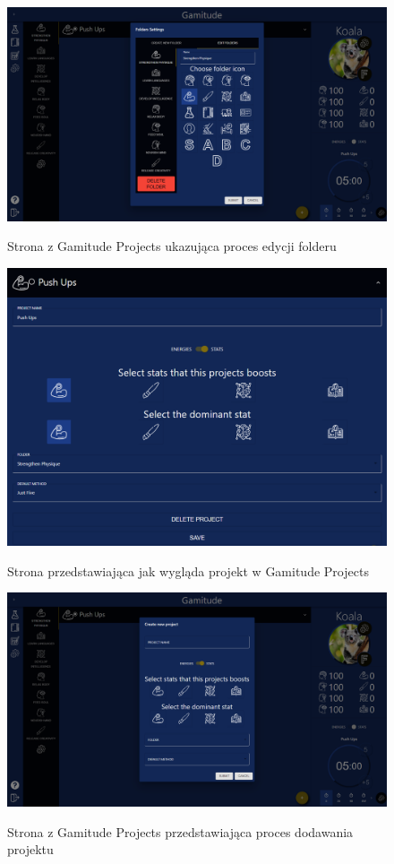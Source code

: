 \documentclass[a4paper,11pt]{report}
\begin{document}
\begin{figure}[H]
	\centering
	\includegraphics[scale=0.3]{prezentacja/Folders_edit}\\
	\caption{Strona z Gamitude Projects ukazująca proces edycji folderu}
	\label{fig:Folders_edit}
\end{figure}
\begin{figure}[H]
	\centering
	\includegraphics[scale=0.3]{prezentacja/Project}\\
	\caption{Strona przedstawiająca jak wygląda projekt w Gamitude Projects}
	\label{fig:Project}
\end{figure}
\begin{figure}[H]
	\centering
	\includegraphics[scale=0.3]{prezentacja/Projects_add}\\
	\caption{Strona z Gamitude Projects przedstawiająca proces dodawania projektu}
	\label{fig:Projects_add}
\end{figure}
\end{document}
